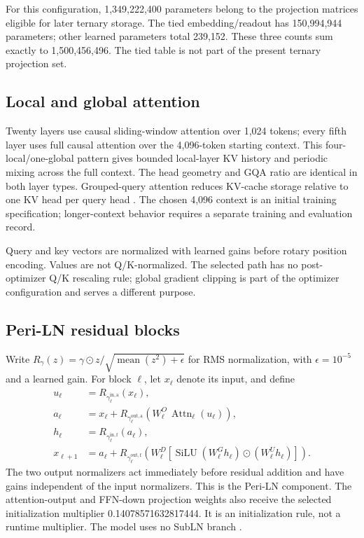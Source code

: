 \documentclass[11pt]{article}
\begin{document}
For this configuration, 1,349,222,400 parameters belong to the projection
matrices eligible for later ternary storage. The tied embedding/readout has
150,994,944 parameters; other learned parameters total 239,152. These three
counts sum exactly to 1,500,456,496. The tied table is not part of the
present ternary projection set.

\subsection{Local and global attention}

Twenty layers use causal sliding-window attention over 1,024 tokens; every
fifth layer uses full causal attention over the 4,096-token starting context.
This four-local/one-global pattern gives bounded local-layer KV history and
periodic mixing across the full context. The head geometry and GQA ratio are
identical in both layer types. Grouped-query attention reduces KV-cache
storage relative to one KV head per query head \cite{gqa}. The chosen 4,096
context is an initial training specification; longer-context behavior
requires a separate training and evaluation record.

Query and key vectors are normalized with learned gains before rotary
position encoding. Values are not Q/K-normalized. The selected path has no
post-optimizer Q/K rescaling rule; global gradient clipping is part of the
optimizer configuration and serves a different purpose.

\subsection{Peri-LN residual blocks}

Write $R_{\gamma}(z)=\gamma\odot z/\sqrt{\operatorname{mean}(z^2)+\epsilon}$
for RMS normalization, with $\epsilon=10^{-5}$ and a learned gain. For block
$\ell$, let $x_\ell$ denote its input, and define
\begin{align}
u_\ell &= R_{\gamma^{\mathrm{in,a}}_\ell}(x_\ell),\\
a_\ell &= x_\ell +
  R_{\gamma^{\mathrm{out,a}}_\ell}
  \!\left(W^O_\ell\,\operatorname{Attn}_\ell(u_\ell)\right),\\
h_\ell &= R_{\gamma^{\mathrm{in,f}}_\ell}(a_\ell),\\
x_{\ell+1} &= a_\ell +
  R_{\gamma^{\mathrm{out,f}}_\ell}
  \!\left(W^D_\ell
  [\operatorname{SiLU}(W^G_\ell h_\ell)\odot(W^U_\ell h_\ell)]\right).
\end{align}
The two output normalizers act immediately before residual addition and
have gains independent of the input normalizers. This is the Peri-LN
component. The attention-output and FFN-down projection weights also receive
the selected initialization multiplier 0.14078571632817444. It is an
initialization rule, not a runtime multiplier. The model uses no SubLN
branch \cite{rmsnorm,swiglu,peri}.
\end{document}
